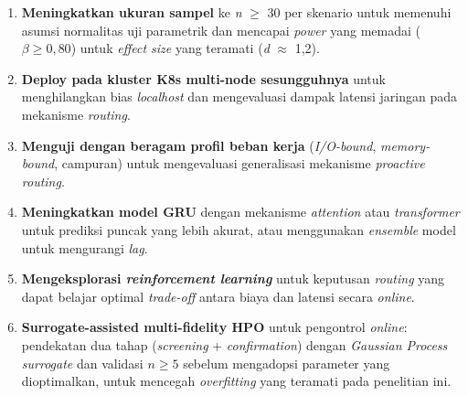 \begin{enumerate}
    \item \textbf{Meningkatkan ukuran sampel} ke \emph{n} $\geq$ 30 per skenario untuk memenuhi asumsi normalitas uji parametrik dan mencapai \emph{power} yang memadai ($\beta \geq 0,80$) untuk \emph{effect size} yang teramati (\emph{d} $\approx$ 1,2).

    \item \textbf{Deploy pada kluster K8s multi-node sesungguhnya} untuk menghilangkan bias \emph{localhost} dan mengevaluasi dampak latensi jaringan pada mekanisme \emph{routing}.

    \item \textbf{Menguji dengan beragam profil beban kerja} (\emph{I/O-bound}, \emph{memory-bound}, campuran) untuk mengevaluasi generalisasi mekanisme \emph{proactive routing}.

    \item \textbf{Meningkatkan model GRU} dengan mekanisme \emph{attention} atau \emph{transformer} untuk prediksi puncak yang lebih akurat, atau menggunakan \emph{ensemble} model untuk mengurangi \emph{lag}.

    \item \textbf{Mengeksplorasi \emph{reinforcement learning}} untuk keputusan \emph{routing} yang dapat belajar optimal \emph{trade-off} antara biaya dan latensi secara \emph{online}.

    \item \textbf{Surrogate-assisted multi-fidelity HPO} untuk pengontrol \emph{online}: pendekatan dua tahap (\emph{screening} + \emph{confirmation}) dengan \emph{Gaussian Process} \emph{surrogate} dan validasi $n \geq 5$ sebelum mengadopsi parameter yang dioptimalkan, untuk mencegah \emph{overfitting} yang teramati pada penelitian ini.
\end{enumerate}

